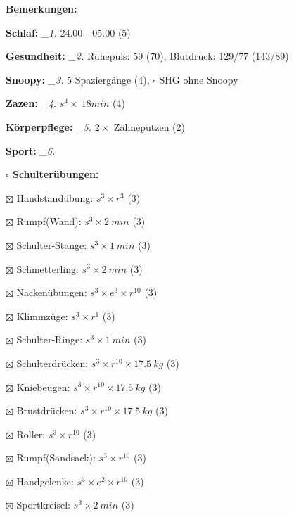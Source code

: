 \documentclass[10pt,a4paper]{article}
\newcommand\prop[1] {{\color {alizarin} {\bf #1}}}             %
\newcommand\mand[1] {{\color {burntorange} {\bf #1}}}          %
\newcommand\topspace{\vskip -15pt \hskip 20pt}
\newcommand\n[1] { {\sl #1.} \hskip 5pt }
\begin{document}
\begin{mdframed}[style=daystyle]
  \begin{labeling}{{\mand {Bemerkungen:}}}
    \setlength\itemsep{-3pt}
  \item[{\mand {Schlaf:}}]        \n{\_1} 24.00 - 05.00 (5)
  \item[{\mand {Gesundheit:}}]    \n{\_2} Ruhepuls: 59 (70), Blutdruck: 129/77 (143/89)
  \item[{\mand {Snoopy:}}]        \n{\_3} 5 Spaziergänge (4), $\square$ SHG ohne Snoopy
  \item[{\mand {Zazen:}}]         \n{\_4} $s^4 \times\ 18 min$ (4)
  \item[{\mand {Körperpflege:}}]  \n{\_5} $2 \times$ Zähneputzen (2)
  \item[{\mand {Sport:}}]         \n{\_6}
    \topspace
    \begin{minipage}{0.75\textwidth}  
      \begin{labeling}{\prop {$\square$ {Schulterübungen:}}} 
        \setlength\itemsep{-3pt}
      \item[$\boxtimes$ Handstandübung:]  $s^3 \times r^{3}$ (3)
      \item[$\boxtimes$ Rumpf(Wand):]     $s^3 \times 2\ min$ (3)
      \item[$\boxtimes$ Schulter-Stange:] $s^3 \times 1\ min$ (3)
      \item[$\boxtimes$ Schmetterling:]   $s^3 \times 2\ min$ (3)
      \item[$\boxtimes$ Nackenübungen:]   $s^3 \times e^3 \times r^{10}$ (3)
      \item[$\boxtimes$ Klimmzüge:]       $s^3 \times r^1$ (3)
      \item[$\boxtimes$ Schulter-Ringe:]  $s^3 \times 1\ min$ (3)
      \item[$\boxtimes$ Schulterdrücken:] $s^3 \times r^{10} \times 17.5\ kg$ (3)
      \item[$\boxtimes$ Kniebeugen:]      $s^3 \times r^{10} \times 17.5\ kg$ (3)
      \item[$\boxtimes$ Brustdrücken:]    $s^3 \times r^{10} \times 17.5\ kg$ (3)
      \item[$\boxtimes$ Roller:]          $s^3 \times r^{10}$ (3)
      \item[$\boxtimes$ Rumpf(Sandsack):] $s^3 \times r^{10}$ (3)
      \item[$\boxtimes$ Handgelenke:]     $s^3 \times e^2 \times r^{10}$ (3)
      \item[$\boxtimes$ Sportkreisel:]    $s^3 \times 2\ min$ (3)

\end{labeling}
\end{minipage}
\end{labeling}
\end{mdframed}
\end{document}

